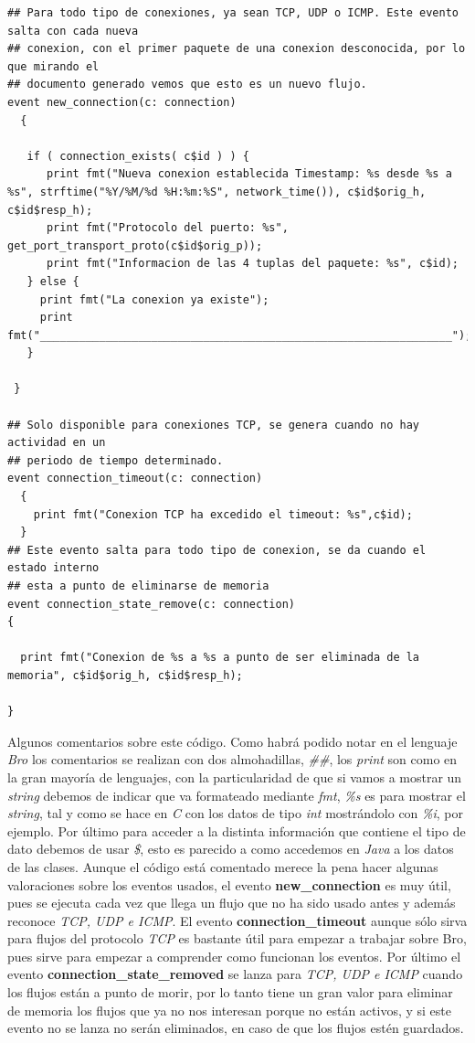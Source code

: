\begin{lstlisting}[style=CodigoC]
## Para todo tipo de conexiones, ya sean TCP, UDP o ICMP. Este evento salta con cada nueva
## conexion, con el primer paquete de una conexion desconocida, por lo que mirando el
## documento generado vemos que esto es un nuevo flujo.
event new_connection(c: connection)
  {

   if ( connection_exists( c$id ) ) {
      print fmt("Nueva conexion establecida Timestamp: %s desde %s a %s", strftime("%Y/%M/%d %H:%m:%S", network_time()), c$id$orig_h, c$id$resp_h);
      print fmt("Protocolo del puerto: %s", get_port_transport_proto(c$id$orig_p));
      print fmt("Informacion de las 4 tuplas del paquete: %s", c$id);
   } else {
     print fmt("La conexion ya existe");
     print fmt("_______________________________________________________________");
   }

 }

## Solo disponible para conexiones TCP, se genera cuando no hay actividad en un
## periodo de tiempo determinado.
event connection_timeout(c: connection)
  {
    print fmt("Conexion TCP ha excedido el timeout: %s",c$id);
  }
## Este evento salta para todo tipo de conexion, se da cuando el estado interno
## esta a punto de eliminarse de memoria
event connection_state_remove(c: connection)
{

  print fmt("Conexion de %s a %s a punto de ser eliminada de la memoria", c$id$orig_h, c$id$resp_h);

}
\end{lstlisting}

\noindent Algunos comentarios sobre este código. Como habrá podido notar en el 
lenguaje \textit{Bro} los comentarios se realizan con dos almohadillas, \textit{\#\#}, 
los \textit{print} son como en la gran mayoría de lenguajes, con la particularidad 
de que si vamos a mostrar un \textit{string} debemos de indicar que va formateado 
mediante \textit{fmt}, \textit{\%s} es para mostrar el \textit{string}, tal y como se hace en \textit{C} con 
los datos de tipo \textit{int} mostrándolo con \textit{\%i}, por ejemplo. Por último para 
acceder a la distinta información que contiene el tipo de dato debemos 
de usar \textit{\$}, esto es parecido a como accedemos en \textit{Java} a los datos de las clases.
\intro
Aunque el código está comentado merece la pena hacer algunas valoraciones 
sobre los eventos usados, el evento \textbf{new\_connection} es muy útil, pues se 
ejecuta cada vez que llega un flujo que no ha sido usado antes y además 
reconoce \textit{TCP, UDP e ICMP}. El evento \textbf{connection\_timeout} aunque sólo sirva 
para flujos del protocolo \textit{TCP} es bastante útil para empezar a trabajar 
sobre Bro, pues sirve para empezar a comprender como funcionan los eventos. 
Por último el evento \textbf{connection\_state\_removed} se lanza para \textit{TCP, UDP e ICMP} 
cuando los flujos están a punto de morir, por lo tanto tiene un gran valor 
para eliminar de memoria los flujos que ya no nos interesan porque no están 
activos, y si este evento no se lanza no serán eliminados, en caso de que 
los flujos estén guardados.

